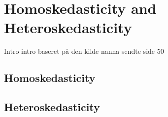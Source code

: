 \section{Homoskedasticity and Heteroskedasticity}
Intro intro baseret på den kilde nanna sendte side 50 

\subsection{Homoskedasticity}

\begin{definition}[Homoskedasticity]

\end{definition}
\subsection{Heteroskedasticity} 

